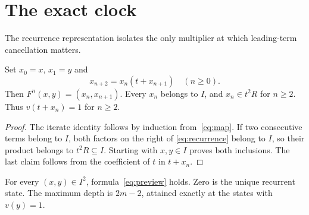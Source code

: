 \section{The exact clock}
\label{sec:clock}

The recurrence representation isolates the only multiplier at which
leading-term cancellation matters.

\begin{lemma}
\label{lem:recurrence}
Set $x_0=x$, $x_1=y$ and
\begin{equation}
 x_{n+2}=x_n(t+x_{n+1})\quad(n\geq0).
 \label{eq:recurrence}
\end{equation}
Then $F^n(x,y)=(x_n,x_{n+1})$. Every $x_n$ belongs to $I$, and
$x_n\in t^2R$ for $n\geq2$. Thus $v(t+x_n)=1$ for $n\geq2$.
\end{lemma}

\begin{proof}
The iterate identity follows by induction from~\eqref{eq:map}.
If two consecutive terms belong to $I$, both factors on the right of
\eqref{eq:recurrence} belong to $I$, so their product belongs to $t^2R
\subseteq I$. Starting with $x,y\in I$ proves both inclusions. The last
claim follows from the coefficient of $t$ in $t+x_n$.
\end{proof}

\begin{theorem}
\label{thm:clock}
For every $(x,y)\in I^2$, formula~\eqref{eq:preview} holds. Zero is the
unique recurrent state. The maximum depth is $2m-2$, attained exactly at
the states with $v(y)=1$.
\end{theorem}

